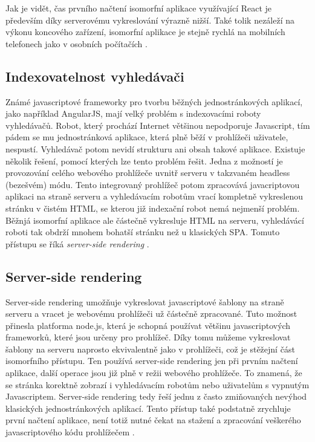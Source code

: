Jak je vidět, čas prvního načtení isomorfní aplikace využívající React je především díky serverovému vykreslování výrazně nižší. Také tolik nezáleží na výkonu koncového zařízení, isomorfní aplikace je stejně rychlá na mobilních telefonech jako v osobních počítačích \cite{isomorhic_book} \cite{codepicnic_universaljs}. 

\subsection{Indexovatelnost vyhledávači}
Známé javascriptové frameworky pro tvorbu běžných jednostránkových aplikací, jako například AngularJS, mají velký problém s indexovacími roboty vyhledávačů. Robot, který prochází Internet většinou nepodporuje Javascript, tím pádem se mu jednostránková aplikace, která plně běží v prohlížeči uživatele, nespustí. Vyhledávač potom nevidí strukturu ani obsah takové aplikace. Existuje několik řešení, pomocí kterých lze tento problém řešit. Jedna z možností je provozování celého webového prohlížeče uvnitř serveru v takzvaném headless (bezešvém) módu. Tento integrovaný prohlížeč potom zpracovává javacriptovou aplikaci na straně serveru a vyhledávacím robotům vrací kompletně vykreslenou stránku v čistém HTML, se kterou již indexační robot nemá nejmenší problém. Běžnjá isomorfní aplikace ale částečně vykresluje HTML na serveru, vyhledávácí roboti tak obdrží mnohem bohatší stránku než u klasických SPA. Tomuto přístupu se říká \textit{server-side rendering} \cite{isomorhic_book} \cite{codepicnic_universaljs}.

\subsection{Server-side rendering}
\label{sec:server_side_rendering}
Server-side rendering umožňuje vykreslovat javascriptové šablony na straně serveru a vracet je webovému prohlížeči už částečně zpracované. Tuto možnost přinesla platforma node.js, která je schopná používat většinu javascriptových frameworků, které jsou určeny pro prohlížeč. Díky tomu můžeme vykreslovat šablony na serveru naprosto ekvivalentně jako v prohlížeči, což je stěžejní část isomorfního přístupu. Ten používá server-side rendering jen při prvním načtení aplikace, další operace jsou již plně v režii webového prohlížeče. To znamená, že se stránka korektně zobrazí i vyhledávacím robotům nebo uživatelům s vypnutým Javascriptem. Server-side rendering tedy řeší jednu z často zmiňovaných nevýhod klasických jednostránkových aplikací. Tento přístup také podstatně zrychluje první načtení aplikace, není totiž nutné čekat na stažení a zpracování veškerého javascriptového kódu prohlížečem \cite{isomorhic_book} \cite{codepicnic_universaljs}.

